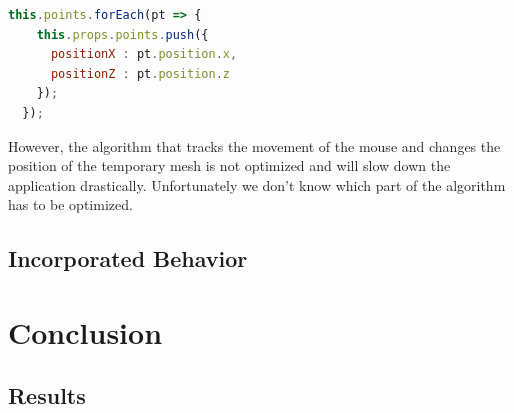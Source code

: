 \documentclass{scrbook}
\begin{document}
\begin{lstlisting}[language=JavaScript, gobble=2, basicstyle=\ttfamily\small]
  this.points.forEach(pt => {                      
    this.props.points.push({
      positionX : pt.position.x,
      positionZ : pt.position.z
    });
  });
\end{lstlisting} 

However, the algorithm that tracks the movement of the mouse and changes the position of the temporary mesh is not optimized and will slow down the application drastically. Unfortunately we don't know which part of the algorithm has to be optimized.

\section{Incorporated Behavior}

\chapter{Conclusion}

\section{Results}
\end{document}
